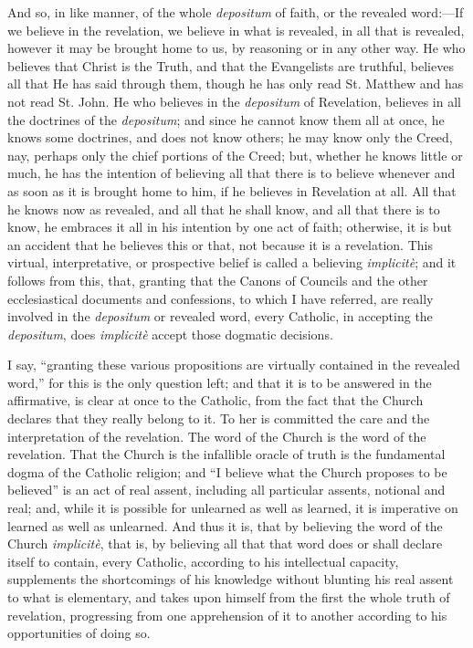And so, in like manner, of the whole \emph{depositum} of faith, or
the revealed word:—If we believe in the revelation, we believe in
what is revealed, in all that is revealed, however it may be brought
home to us, by reasoning or in any other way. He who believes that
Christ is the Truth, and that the Evangelists are truthful, believes
all that He has said through them, though he has only read St. Matthew
and has not read St. John. He who believes in the \emph{depositum} of
Revelation, believes in all the doctrines of the \emph{depositum}; and
since he cannot know them all at once, he knows some doctrines, and
does not know others; he may know only the Creed, nay, perhaps only
the chief portions of the Creed; but, whether he knows little or much,
he has the intention of believing all that there is to believe
whenever and as soon as it is brought home to him, if he believes in
Revelation at all. All that he knows now as revealed, and all that he
shall know, and all that there is to know, he embraces it all in his
intention by one act of faith; otherwise, it is but an accident that
he believes this or that, not because it is a revelation. This
virtual, interpretative, or prospective belief is called a believing \emph{implicitè};
and it follows from this, that, granting that the Canons of Councils
and the other ecclesiastical documents and confessions, to which I
have referred, are really involved in the \emph{depositum} or revealed
word, every Catholic, in accepting the \emph{depositum}, does \emph{implicitè}
accept those dogmatic decisions.

I say, ``granting these various propositions are virtually
contained in the revealed word,'' for this is the only
question left; and that it is to be answered in the affirmative, is
clear at once to the Catholic, from the fact that the Church declares
that they really belong to it. To her is committed the care and the
interpretation of the revelation. The word of the Church is the word
of the revelation. That the Church is the infallible oracle of truth
is the fundamental dogma of the Catholic religion; and ``I believe
what the Church proposes to be believed'' is an act of real
assent, including all particular assents, notional and real; and,
while it is possible for unlearned as well as learned, it is
imperative on learned as well as unlearned. And thus it is, that by
believing the word of the Church \emph{implicitè}, that is, by
believing all that that word does or shall declare itself to contain,
every Catholic, according to his intellectual capacity, supplements
the shortcomings of his knowledge without blunting his real assent to
what is elementary, and takes upon himself from the first the whole
truth of revelation, progressing from one apprehension of it to
another according to his opportunities of doing so.

